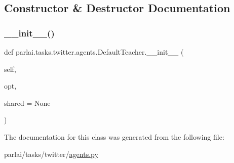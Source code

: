 \subsection{Constructor \& Destructor Documentation}
\mbox{\label{classparlai_1_1tasks_1_1twitter_1_1agents_1_1DefaultTeacher_a6351654c7d50fa7c723a2d38bd00d0d8}} 
\subsubsection{\texorpdfstring{\+\_\+\+\_\+init\+\_\+\+\_\+()}{\_\_init\_\_()}}
{\footnotesize\ttfamily def parlai.\+tasks.\+twitter.\+agents.\+Default\+Teacher.\+\_\+\+\_\+init\+\_\+\+\_\+ (\begin{DoxyParamCaption}\item[{}]{self,  }\item[{}]{opt,  }\item[{}]{shared = {\ttfamily None} }\end{DoxyParamCaption})}



The documentation for this class was generated from the following file\+:\begin{DoxyCompactItemize}
\item 
parlai/tasks/twitter/\hyperlink{parlai_2tasks_2twitter_2agents_8py}{agents.\+py}\end{DoxyCompactItemize}
